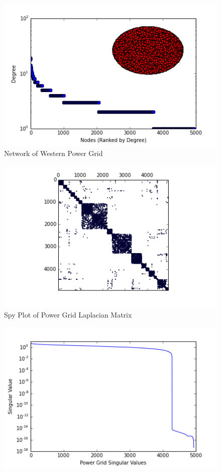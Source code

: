 \documentclass{article}
\begin{document}
\begin{figure}
\centering

\includegraphics[width=\linewidth]{power_degree_histogram.png}
\caption{Network of Western Power Grid}
  
\end{figure}

\begin{figure}
\centering
\includegraphics[width = \linewidth]{powerspy.png}
\caption{Spy Plot of Power Grid Laplacian Matrix}
\end{figure}

\begin{figure}
\centering
\includegraphics[width = \linewidth]{powersing.png}
\end{figure}
\end{document}
